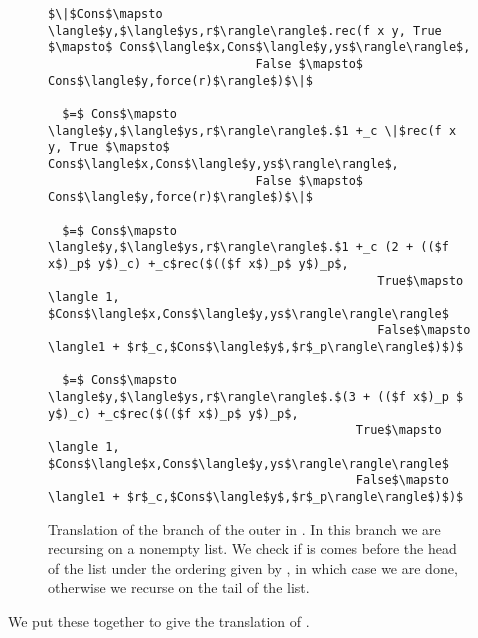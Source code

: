 \begin{figure}[H]
\caption{Translation of the  branch of the outer  in .
In this branch we are recursing on a nonempty list.
We check if  is comes before the head of the list under the ordering given by , in which case we are done, 
  otherwise we recurse on the tail of the list.
}
\label{fig:insert_cons}
\begin{lstlisting}
$\|$Cons$\mapsto \langle$y,$\langle$ys,r$\rangle\rangle$.rec(f x y, True $\mapsto$ Cons$\langle$x,Cons$\langle$y,ys$\rangle\rangle$,
                             False $\mapsto$ Cons$\langle$y,force(r)$\rangle$)$\|$

  $=$ Cons$\mapsto \langle$y,$\langle$ys,r$\rangle\rangle$.$1 +_c \|$rec(f x y, True $\mapsto$ Cons$\langle$x,Cons$\langle$y,ys$\rangle\rangle$,
                             False $\mapsto$ Cons$\langle$y,force(r)$\rangle$)$\|$

  $=$ Cons$\mapsto \langle$y,$\langle$ys,r$\rangle\rangle$.$1 +_c (2 + (($f x$)_p$ y$)_c) +_c$rec($(($f x$)_p$ y$)_p$,
                                              True$\mapsto \langle 1, $Cons$\langle$x,Cons$\langle$y,ys$\rangle\rangle\rangle$
                                              False$\mapsto \langle1 + $r$_c,$Cons$\langle$y$,$r$_p\rangle\rangle$)$)$

  $=$ Cons$\mapsto \langle$y,$\langle$ys,r$\rangle\rangle$.$(3 + (($f x$)_p $ y$)_c) +_c$rec($(($f x$)_p$ y$)_p$,
                                           True$\mapsto \langle 1, $Cons$\langle$x,Cons$\langle$y,ys$\rangle\rangle\rangle$
                                           False$\mapsto \langle1 + $r$_c,$Cons$\langle$y$,$r$_p\rangle\rangle$)$)$
\end{lstlisting}
\end{figure}


We put these together to give the translation of .

